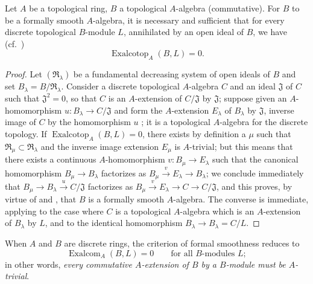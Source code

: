 \begin{proposition}[19.4.4]
\label{0.19.4.4}
Let $A$ be a topological ring, $B$ a topological $A$-algebra (commutative).
For $B$ to be a formally smooth $A$-algebra, it is necessary and sufficient that for
every discrete topological $B$-module $L$, annihilated by an open ideal of $B$, we have (cf.~)
\[
  \operatorname{Exalcotop}_A(B,L)=0.
\]
\end{proposition}

\begin{proof}
Let $(\mathfrak{R}_\lambda)$ be a fundamental decreasing system of open ideals of $B$ and set $B_\lambda=B/\mathfrak{R}_\lambda$.
Consider a discrete topological $A$-algebra $C$ and an ideal $\mathfrak{J}$ of $C$ such that $\mathfrak{J}^2=0$, so that $C$ is an $A$-extension of $C/\mathfrak{J}$ by $\mathfrak{J}$;
suppose given an $A$-homomorphism $u:B_\lambda\to C/\mathfrak{J}$ and form the $A$-extension $E_\lambda$ of $B_\lambda$ by $\mathfrak{J}$, inverse image of $C$ by the homomorphism $u$ ;
it is a topological $A$-algebra for the discrete topology.
If $\operatorname{Exalcotop}_A(B,L)=0$, there exists by definition  a $\mu$ such that $\mathfrak{R}_\mu\subset\mathfrak{R}_\lambda$ and the inverse image extension $E_\mu$ is $A$-trivial;
but this means  that there exists a continuous $A$-homomorphism $v:B_\mu\to E_\lambda$ such that the canonical homomorphism $B_\mu\to B_\lambda$ factorizes as $B_\mu\xrightarrow{v}E_\lambda\to B_\lambda$;
we conclude immediately that $B_\mu\to B_\lambda\xrightarrow{u}C/\mathfrak{J}$ factorizes as $B_\mu\xrightarrow{v}E_\lambda\to C\to C/\mathfrak{J}$,
and this proves, by virtue of  and , that $B$ is a formally smooth $A$-algebra.
The converse is immediate, applying  to the case where $C$ is a topological $A$-algebra which is an $A$-extension of $B_\lambda$ by $L$, and to the identical homomorphism $B_\lambda\to B_\lambda=C/L$.
\end{proof}

When $A$ and $B$ are discrete rings, the criterion of formal smoothness  reduces to
\begin{equation}
\tag{19.4.4.1}
\label{0.19.4.4.1}
\operatorname{Exalcom}_A(B,L)=0 \qquad\text{for all $B$-modules $L$};
\end{equation}
in other words, \emph{every commutative $A$-extension of $B$ by a $B$-module must be $A$-trivial}.


